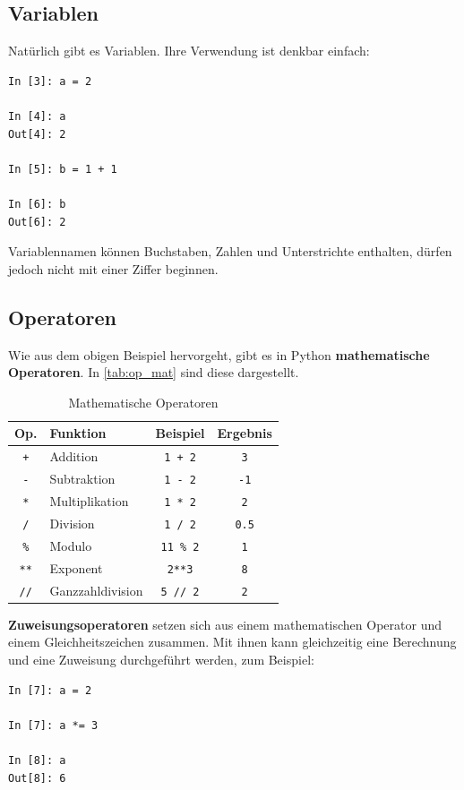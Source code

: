 \subsection{Variablen}
Natürlich gibt es Variablen. Ihre Verwendung ist denkbar einfach:
\begin{verbatim}
In [3]: a = 2

In [4]: a
Out[4]: 2

In [5]: b = 1 + 1

In [6]: b
Out[6]: 2
\end{verbatim}
Variablennamen können Buchstaben, Zahlen und Unterstrichte enthalten, dürfen jedoch nicht mit einer Ziffer beginnen.

\subsection{Operatoren}
Wie aus dem obigen Beispiel hervorgeht, gibt es in Python \textbf{mathematische Operatoren}.
In \autoref{tab:op_mat} sind diese dargestellt.

\begin{table}[H]
  \centering{}
  \caption{Mathematische Operatoren}
  \label{tab:op_mat}
  \begin{tabular}{c l c c}
    \toprule
    Op.         & Funktion         & Beispiel         & Ergebnis \\
    \midrule
    \texttt{+}  & Addition         & \texttt{1 + 2}   & \texttt{3} \\
    \texttt{-}  & Subtraktion      & \texttt{1 - 2}   & \texttt{-1} \\
    \texttt{*}  & Multiplikation   & \texttt{1 * 2}   & \texttt{2} \\
    \texttt{/}  & Division         & \texttt{1 / 2}   & \texttt{0.5} \\
    \texttt{\%} & Modulo           & \texttt{11 \% 2} & \texttt{1} \\
    \texttt{**} & Exponent         & \texttt{2**3}  & \texttt{8} \\
    \texttt{//} & Ganzzahldivision & \texttt{5 // 2}  & \texttt{2} \\
    \bottomrule
  \end{tabular}
\end{table}

\textbf{Zuweisungsoperatoren} setzen sich aus einem mathematischen Operator und einem Gleichheitszeichen zusammen.
Mit ihnen kann gleichzeitig eine Berechnung und eine Zuweisung durchgeführt werden, zum Beispiel:
\begin{verbatim}
In [7]: a = 2

In [7]: a *= 3

In [8]: a
Out[8]: 6
\end{verbatim}

